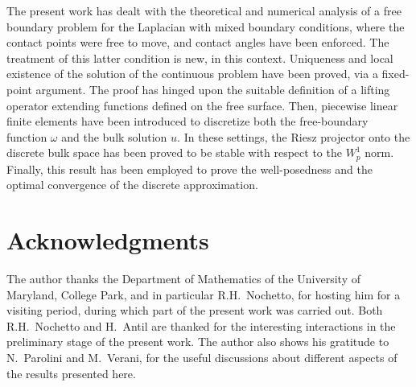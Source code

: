 \documentclass[final,hidelinks]{siamart1116Arxiv}
\numberwithin{theorem}{section}
\newcommand{\sol}{{u}}
\begin{document}
The present work has dealt with the theoretical and numerical analysis of a free boundary problem for the Laplacian with mixed boundary conditions,
where the contact points were free to move, and contact angles have been enforced.
The treatment of this latter condition is new, in this context.
Uniqueness and local existence of the solution of the continuous problem have been proved, via a fixed-point argument.
The proof has hinged upon the suitable definition of a lifting operator extending functions defined on the free surface.
Then, piecewise linear finite elements have been introduced to discretize both the free-boundary function $\omega$ and the bulk solution $\sol$.
In these settings, the Riesz projector onto the discrete bulk space has been proved to be stable with respect to the $W^1_p$ norm.
Finally, this result has been employed to prove the well-posedness and the optimal convergence of the discrete approximation.

\appendix

\section*{Acknowledgments}

The author thanks the Department of Mathematics of the University of Maryland, College Park, and in particular R.H.~Nochetto, for hosting him for a visiting period, during which part of the present work was carried out. Both R.H.~Nochetto and H.~Antil are thanked for the interesting interactions in the preliminary stage of the present work.
The author also shows his gratitude to N.~Parolini and M.~Verani, for the useful discussions about different aspects of the results presented here.


\end{document}

